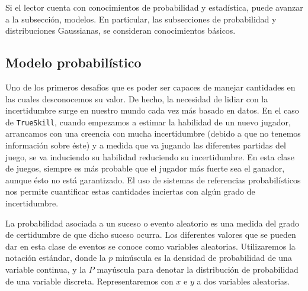 \documentclass[11pt,twoside, spanish]{report} %
\begin{document}
Si el lector cuenta con conocimientos de probabilidad y estad\'istica, puede avanzar a la subsecci\'on, modelos.
En particular, las subsecciones de probabilidad y distribuciones Gaussianas, se consideran conocimientos b\'asicos.





\subsection{Modelo probabil\'istico}

Uno de los primeros desaf\'ios que es poder ser capaces de manejar cantidades en las cuales desconocemos su valor.
De hecho, la necesidad de lidiar con la incertidumbre surge en nuestro mundo cada vez m\'as basado en datos.
En el caso de \texttt{TrueSkill}, cuando empezamos a estimar la habilidad de un nuevo jugador, arrancamos con una creencia con mucha incertidumbre (debido a que no tenemos informaci\'on sobre \'este) y a medida que va jugando las diferentes partidas del juego, se va induciendo su habilidad reduciendo su incertidumbre.
En esta clase de juegos, siempre es m\'as probable que el jugador m\'as fuerte sea el ganador, aunque \'esto no est\'a garantizado.
El uso de sistemas de referencias probabil\'isticos nos permite cuantificar estas cantidades inciertas con alg\'un grado de incertidumbre.

La probabilidad asociada a un suceso o evento aleatorio es una medida del grado de certidumbre de que dicho suceso ocurra.
Los diferentes valores que se pueden dar en esta  clase de eventos se conoce como variables aleatorias.
Utilizaremos la notaci\'on est\'andar, donde la $p$ min\'uscula es la densidad de probabilidad de una variable continua, y la $P$ may\'uscula para denotar la distribuci\'on de probabilidad de una variable discreta.
Representaremos con $x$ e $y$ a dos variables aleatorias.
\end{document}
